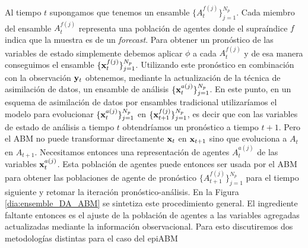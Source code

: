 Al tiempo $t$ supongamos que tenemos un ensamble $\{ A_{t}^{f(j)} \}_{j=1}^{N_p}$. Cada miembro del ensamble $A_{t}^{f(j)}$ representa una población de agentes donde el supraíndice $f$ indica que la muestra es de un \textit{forecast}. Para obtener un pronóstico de las variables de estado simplemente debemos aplicar $\phi$ a cada $A_{t}^{f(j)}$ y de esa manera conseguimos el ensamble $\{ \mathbf{x}_{t}^{f(j)} \}_{j=1}^{N_p}$. Utilizando este pronóstico en combinación con la observación $\mathbf{y}_t$ obtenemos, mediante la actualización de la técnica de asimilación de datos, un ensamble de análisis $\{ \mathbf{x}_{t}^{a(j)} \}_{j=1}^{N_p}$. En este punto, en un esquema de asimilación de datos por ensambles tradicional utilizaríamos el modelo para evolucionar $\{ \mathbf{x}_{t}^{a(j)} \}_{j=1}^{N_p}$ en $\{ \mathbf{x}_{t+1}^{f(j)} \}_{j=1}^{N_p}$, es decir que con las variables de estado de análisis a tiempo $t$ obtendríamos un pronóstico a tiempo $t+1$. Pero el ABM no puede transformar directamente $\mathbf{x}_t$ en $\mathbf{x}_{t+1}$ sino que evoluciona a $A_t$ en $A_{t+1}$. Necesitamos entonces una representación de agentes $A_{t}^{a(j)}$ de las variables $\mathbf{x}_{t}^{a(j)}$. Esta población de agentes puede entonces ser usada por el ABM para obtener las poblaciones de agente de pronóstico $\{ A_{t+1}^{f(j)} \}_{j=1}^{N_p}$ para el tiempo siguiente y retomar la iteración pronóstico-análisis. En la Figura \ref{dia:ensemble_DA_ABM} se sintetiza este procedimiento general. El ingrediente faltante entonces es el ajuste de la población de agentes a las variables agregadas actualizadas mediante la información observacional. Para esto discutiremos dos metodologías distintas para el caso del epiABM

